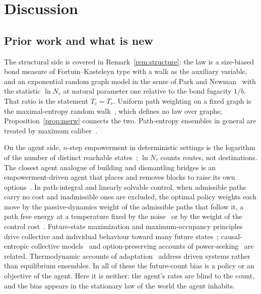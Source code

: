 \documentclass[aps,pre,preprint,superscriptaddress,nofootinbib]{revtex4-2}
\theoremstyle{definition}
\theoremstyle{remark}
\newcommand{\N}{N_\tau}
\begin{document}
\section{Discussion}
\label{sec:discussion}

\subsection{Prior work and what is new}

The structural side is covered in Remark~\ref{rem:structure}: the law is a size-biased bond measure of Fortuin--Kasteleyn type with a walk as the auxiliary variable, and an exponential random graph model in the sense of Park and Newman~\cite{ParkNewman2004} with the statistic $\ln\N$ at natural parameter one relative to the bond fugacity $1/b$. That ratio is the statement $T_c=T_r$. Uniform path weighting on a fixed graph is the maximal-entropy random walk~\cite{Parry1964,Burda2009}, which defines no law over graphs; Proposition~\ref{prop:merw} connects the two. Path-entropy ensembles in general are treated by maximum caliber~\cite{Presse2013}.

On the agent side, $n$-step empowerment in deterministic settings is the logarithm of the number of distinct reachable states~\cite{Klyubin2005,Klyubin2008,SalgeIntro2014}; $\ln\N$ counts routes, not destinations. The closest agent analogue of building and dismantling bridges is an empowerment-driven agent that places and removes blocks to raise its own options~\cite{Salge2014}. In path-integral and linearly solvable control, when admissible paths carry no cost and inadmissible ones are excluded, the optimal policy weights each move by the passive-dynamics weight of the admissible paths that follow it, a path free energy at a temperature fixed by the noise~\cite{Kappen2005} or by the weight of the control cost~\cite{Todorov2009}. Future-state maximization and maximum-occupancy principles drive collective and individual behaviour toward many future states~\cite{CharlesworthTurner2019,RamirezRuiz2024}; causal-entropic collective models~\cite{MannGarnett2015,Hornischer2019} and option-preserving accounts of power-seeking~\cite{Turner2019} are related. Thermodynamic accounts of adaptation~\cite{Perunov2016} address driven systems rather than equilibrium ensembles. In all of these the future-count bias is a policy or an objective of the agent. Here it is neither: the agent's rates are blind to the count, and the bias appears in the stationary law of the world the agent inhabits.
\end{document}
